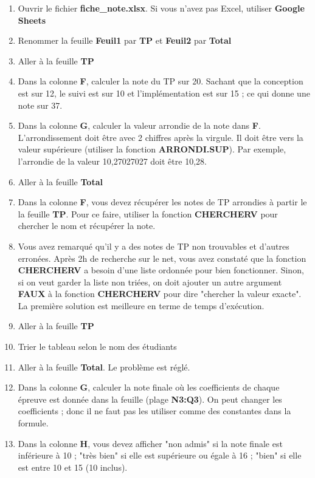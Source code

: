 \documentclass[11pt, a4paper]{article}
\begin{document}
\begin{enumerate}
	\item Ouvrir le fichier \textbf{fiche\_note.xlsx}. Si vous n'avez pas Excel, utiliser \textbf{Google Sheets}
	\item Renommer la feuille \textbf{Feuil1} par \textbf{TP} et \textbf{Feuil2} par \textbf{Total}
	\item Aller à la feuille \textbf{TP}
	\item Dans la colonne \textbf{F}, calculer la note du TP sur 20. Sachant que la conception est sur 12, le suivi est sur 10 et l'implémentation est sur 15 ; ce qui donne une note sur 37.
	\item Dans la colonne \textbf{G}, calculer la valeur arrondie de la note dans \textbf{F}. L'arrondissement doit être avec 2 chiffres après la virgule. Il doit être vers la valeur supérieure (utiliser la fonction \textbf{ARRONDI.SUP}). Par exemple, l'arrondie de la valeur 10,27027027 doit être 10,28.
	\item Aller à la feuille \textbf{Total}
	\item Dans la colonne \textbf{F}, vous devez récupérer les notes de TP arrondies à partir le la feuille \textbf{TP}. Pour ce faire, utiliser la fonction \textbf{CHERCHERV} pour chercher le nom et récupérer la note. 
	\item Vous avez remarqué qu'il y a des notes de TP non trouvables et d'autres erronées. Après 2h de recherche sur le net, vous avez constaté que la fonction \textbf{CHERCHERV} a besoin d'une liste ordonnée pour bien fonctionner. Sinon, si on veut garder la liste non triées, on doit ajouter un autre argument \textbf{FAUX} à la fonction \textbf{CHERCHERV} pour dire "chercher la valeur exacte". La première solution est meilleure en terme de temps d'exécution.
	\item Aller à la feuille \textbf{TP}
	\item Trier le tableau selon le nom des étudiants 
	\item Aller à la feuille \textbf{Total}. Le problème est réglé. 
	\item Dans la colonne \textbf{G}, calculer la note finale où les coefficients de chaque épreuve est donnée dans la feuille (plage \textbf{N3:Q3}). On peut changer les coefficients ; donc il ne faut pas les utiliser comme des constantes dans la formule.
	\item Dans la colonne \textbf{H}, vous devez afficher "non admis" si la note finale est inférieure à 10 ; "très bien" si elle est supérieure ou égale à 16 ; "bien" si elle est entre 10 et 15 (10 inclus). 

\end{enumerate}
\end{document}
